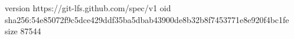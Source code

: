version https://git-lfs.github.com/spec/v1
oid sha256:54e85072f9c5dce429ddf35ba5dbab43900de8b32b8f7453771e8e920f4bc1fe
size 87544
